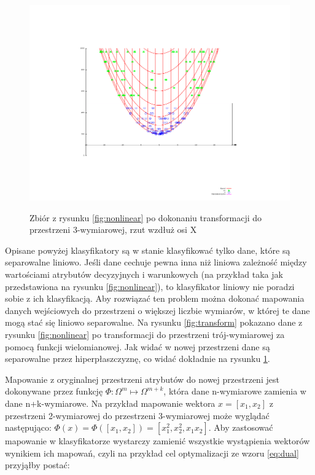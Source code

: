 \begin{figure}[h]
\centering
\includegraphics[scale=0.8]{figures/functions/2-transform-side}
\label{fig:transform-side}
\caption{Zbiór z rysunku \ref{fig:nonlinear} po dokonaniu transformacji do przestrzeni 3-wymiarowej, rzut wzdłuż osi X}
\end{figure}


Opisane powyżej klasyfikatory są w stanie klasyfikować tylko dane, które są separowalne liniowo. Jeśli dane cechuje pewna inna niż liniowa zależność między wartościami atrybutów decyzyjnych i warunkowych (na przykład taka jak przedstawiona na rysunku \ref{fig:nonlinear}), to klasyfikator liniowy nie poradzi sobie z ich klasyfikacją.
Aby rozwiązać ten problem można dokonać mapowania danych wejściowych do przestrzeni o większej liczbie wymiarów, w której te dane mogą stać się liniowo separowalne. Na rysunku \ref{fig:transform} pokazano dane z rysunku \ref{fig:nonlinear} po transformacji do przestrzeni trój-wymiarowej za pomocą funkcji wielomianowej. Jak widać w nowej przestrzeni dane są separowalne przez hiperpłaszczyznę, co widać dokładnie na rysunku \ref{fig:transform-side}.

Mapowanie z oryginalnej przestrzeni atrybutów do nowej przestrzeni jest dokonywane przez funkcję $ \Phi: \Omega^m \mapsto \Omega^{m+k} $, która dane n-wymiarowe zamienia w dane n+k-wymiarowe. Na przykład mapowanie wektora $x = \left[ x_1, x_2 \right] $ z przestrzeni 2-wymiarowej do przestrzeni 3-wymiarowej może wyglądać następująco:
 $ \Phi(x) = \Phi(\left[x_1, x_2 \right]) = \left[ x_1^2, x_2^2, x_1 x_2 \right] $. Aby zastosować mapowanie w klasyfikatorze wystarczy zamienić wszystkie wystąpienia wektorów wynikiem ich mapowań, czyli na przykład cel optymalizacji ze wzoru \ref{eq:dual} przyjąłby postać:

